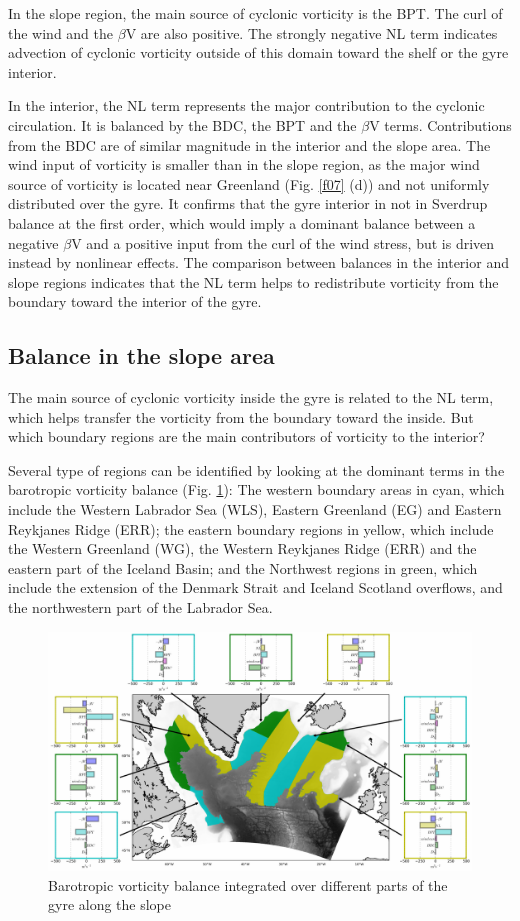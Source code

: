 \documentclass[os, manuscript]{copernicus}
\begin{document}
In the slope region, the main source of cyclonic vorticity is the BPT. The curl of the wind and the $\beta$V are also positive. The strongly negative NL term indicates advection of cyclonic vorticity outside of this domain toward the shelf or the gyre interior.

In the interior, the NL term represents the major contribution to the cyclonic circulation. It is balanced by the BDC, the BPT and the $\beta$V terms. Contributions from the BDC are of similar magnitude in the interior and the slope area. The wind input of vorticity is smaller than in the slope region, as the major wind source of vorticity is located near Greenland (Fig. \ref{f07} (d)) and not uniformly distributed over the gyre. It confirms that the gyre interior in not in Sverdrup balance at the first order, which would imply a dominant balance between a negative $\beta$V and a positive input from the curl of the wind stress, but is driven instead by nonlinear effects. The comparison between balances in the interior and slope regions indicates that the NL term helps to redistribute vorticity from the boundary toward the interior of the gyre. 

\subsection{Balance in the slope area}

The main source of cyclonic vorticity inside the gyre is related to the NL term, which helps transfer the vorticity from the boundary toward the inside. But which boundary regions are the main contributors of vorticity to the interior? 

Several type of regions can be identified by looking at the dominant terms in the barotropic vorticity balance  (Fig. \ref{f11}): The western boundary areas in cyan, which include the Western Labrador Sea (WLS), Eastern Greenland (EG) and Eastern Reykjanes Ridge (ERR); the eastern boundary regions in yellow, which include the Western Greenland (WG), the Western Reykjanes Ridge (ERR) and the eastern part of the Iceland Basin; and the Northwest regions in green, which include the extension of the Denmark Strait and Iceland Scotland overflows, and the northwestern part of the Labrador Sea.

\begin{figure}[t]
\includegraphics[width=15cm]{../fig_os/f11.pdf}
\caption{Barotropic vorticity balance integrated over different parts of the gyre along the slope}
\label{f11}
\end{figure}
\end{document}
